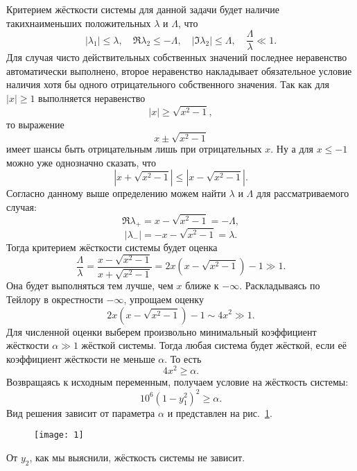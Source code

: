 \documentclass[a4paper]{article}
\begin{document}
\begin{sol}
Критерием жёсткости системы для данной задачи будет наличие такихнаименьших
 положительных $\lambda$ и $\Lambda$, что
\[
|\lambda_1|\le \lambda,\quad \Re \lambda_2\le -\Lambda,\quad
|\Im \lambda_2|\le \Lambda,\quad \frac{\Lambda}{\lambda}\ll 1
.\] 
Для случая чисто действительных собственных значений последнее
неравенство автоматически выполнено, второе неравенство
накладывает обязательное условие наличия хотя бы одного
отрицательного собственного значения.
Так как для $|x|\ge 1$ выполняется неравенство
\[
|x|\ge \sqrt{x^2-1} 
,\] 
то выражение
\[
x\pm \sqrt{x^2-1} 
\] 
имеет шансы быть отрицательным лишь при отрицательных $x$.
Ну а для $x\le -1$ можно уже однозначно сказать, что
\[
\left| x+\sqrt{x^2-1} \right|\le  \left| x-\sqrt{x^2-1}  \right| 
.\] 
Согласно данному выше определению можем найти $\lambda$ и
$\Lambda$ для рассматриваемого случая:
\[
\Re \lambda_+=x-\sqrt{x^2-1} = -\Lambda
,\] 
\[
|\lambda_-|=-x-\sqrt{x^2-1} = \lambda
.\] 
Тогда критерием жёсткости системы будет оценка
\[
\frac{\Lambda}{\lambda}=\frac{x-\sqrt{x^2-1} }{x+\sqrt{x^2-1} }=2 x \left(x-\sqrt{x^2-1}\right)-1 \gg 1
.\] 
Она будет выполняться тем лучше, чем $x$ ближе к $-\infty$.
Раскладываясь по Тейлору в окрестности $-\infty$, упрощаем
оценку
\[
2 x \left(x-\sqrt{x^2-1}\right)-1 \sim 4x^2 \gg 1
.\] 
Для численной оценки выберем произвольно минимальный коэффициент жёсткости $\alpha \gg 1$ жёсткой системы. Тогда любая
система будет жёсткой, если её коэффициент жёсткости не меньше
$\alpha$. То есть
\[
4x^2 \ge \alpha
.\] 
Возвращаясь к исходным переменным, получаем условие на жёсткость системы:
\[
10^6 \left(1-y_1^2\right)^2\geq \alpha
.\] 
Вид решения зависит от параметра $\alpha$ и представлен на рис.~\ref{fig:1}.
\begin{figure}[htpb]
	\centering
	\texttt{[image: 1]}
	\caption{}
	\label{fig:1}
\end{figure}
От $y_2$, как мы выяснили, жёсткость системы не зависит.
%
\end{sol}
\end{document}
